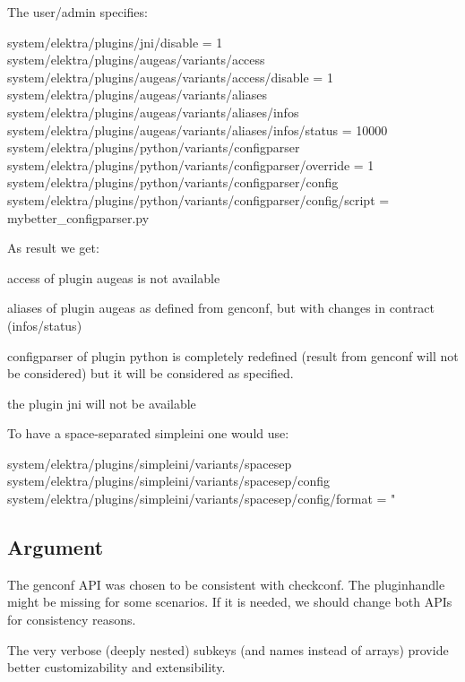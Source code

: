 The user/admin specifies\+: 
\begin{DoxyCode}
system/elektra/plugins/jni/disable = 1
system/elektra/plugins/augeas/variants/access
system/elektra/plugins/augeas/variants/access/disable = 1
system/elektra/plugins/augeas/variants/aliases
system/elektra/plugins/augeas/variants/aliases/infos
system/elektra/plugins/augeas/variants/aliases/infos/status = 10000
system/elektra/plugins/python/variants/configparser
system/elektra/plugins/python/variants/configparser/override = 1
system/elektra/plugins/python/variants/configparser/config
system/elektra/plugins/python/variants/configparser/config/script = mybetter\_configparser.py
\end{DoxyCode}


As result we get\+:


\begin{DoxyEnumerate}
\item {\ttfamily access} of plugin {\ttfamily augeas} is not available
\item {\ttfamily aliases} of plugin {\ttfamily augeas} as defined from {\ttfamily genconf}, but with changes in contract ({\ttfamily infos/status})
\item {\ttfamily configparser} of plugin {\ttfamily python} is completely redefined (result from {\ttfamily genconf} will not be considered) but it will be considered as specified.
\item the plugin {\ttfamily jni} will not be available
\end{DoxyEnumerate}

To have a space-\/separated simpleini one would use\+: 
\begin{DoxyCode}
system/elektra/plugins/simpleini/variants/spacesep
system/elektra/plugins/simpleini/variants/spacesep/config
system/elektra/plugins/simpleini/variants/spacesep/config/format = "%
\end{DoxyCode}


\subsection*{Argument}


\begin{DoxyItemize}
\item The {\ttfamily genconf} A\+PI was chosen to be consistent with {\ttfamily checkconf}. The pluginhandle might be missing for some scenarios. If it is needed, we should change both A\+P\+Is for consistency reasons.
\item The very verbose (deeply nested) subkeys (and names instead of arrays) provide better customizability and extensibility.
\end{DoxyItemize}

